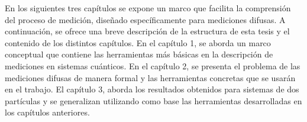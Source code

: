 \documentclass[12pt,oneside]{book}\raggedbottom{} %
\begin{document}
\begin{sloppypar}
{{En los siguientes  tres capítulos se expone un marco que facilita la comprensión del proceso de medición, diseñado específicamente para mediciones difusas. A continuación, se ofrece una breve descripción de la estructura de esta tesis y el contenido de los distintos capítulos.  En el capítulo 1, se aborda un marco conceptual que contiene las herramientas más básicas en la descripción de mediciones en sistemas cuánticos. En el capítulo 2, se presenta el problema de las mediciones difusas de manera formal y las herramientas concretas que se usarán en el trabajo. El capítulo 3, aborda los resultados obtenidos para sistemas de dos partículas y se generalizan utilizando como base las herramientas desarrolladas en los capítulos anteriores. 















}}
\end{sloppypar}
\end{document}
